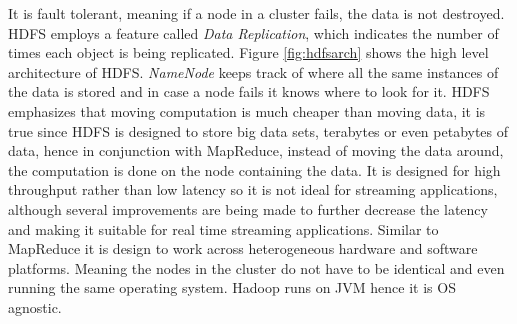 \documentclass[english]{tktltiki}
\begin{document}
It is fault tolerant, meaning if a node in a cluster fails, the data is not destroyed. HDFS employs a feature called \textit{Data Replication}, which indicates the number of times each object is being replicated. Figure \ref{fig:hdfsarch} shows the high level architecture of HDFS. \textit{NameNode} keeps track of where all the same instances of the data is stored and in case a node fails it knows where to look for it. HDFS emphasizes that moving computation is much cheaper than moving data, it is true since HDFS is designed to store big data sets, terabytes or even petabytes of data, hence in conjunction with MapReduce, instead of moving the data around, the computation is done on the node containing the data. It is designed for high throughput  rather than low latency so it is not ideal for streaming applications, although several improvements are being made to further decrease the latency and making it suitable for real time streaming applications. Similar to MapReduce it is design to work across heterogeneous hardware and software platforms. Meaning the nodes in the cluster do not have to be identical and even running the same operating system. Hadoop runs on JVM hence it is OS agnostic. 
\end{document}
